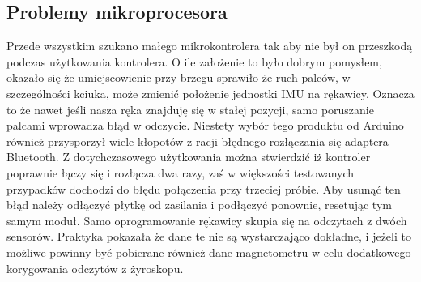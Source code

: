  \subsection{Problemy mikroprocesora}
 \label{subsec:iuMikroprocesor}
 Przede wszystkim szukano małego mikrokontrolera tak aby nie był on przeszkodą podczas użytkowania kontrolera. O ile założenie to było dobrym pomysłem, okazało się że umiejscowienie przy brzegu sprawiło że ruch palców, w szczególności kciuka, może zmienić położenie jednostki IMU na rękawicy. Oznacza to że nawet jeśli nasza ręka znajduję się w stałej pozycji, samo poruszanie palcami wprowadza błąd w odczycie. Niestety wybór tego produktu od Arduino również przysporzył wiele kłopotów z racji błędnego rozłączania się adaptera Bluetooth. Z dotychczasowego użytkowania można stwierdzić iż kontroler poprawnie łączy się i rozłącza dwa razy, zaś w większości testowanych przypadków dochodzi do błędu połączenia przy trzeciej próbie. Aby usunąć ten błąd należy odłączyć płytkę od zasilania i podłączyć ponownie, resetując tym samym moduł. Samo oprogramowanie rękawicy skupia się na odczytach z dwóch sensorów. Praktyka pokazała że dane te nie są wystarczająco dokładne, i jeżeli to możliwe powinny być pobierane również dane magnetometru w celu dodatkowego korygowania odczytów z żyroskopu. 
 
